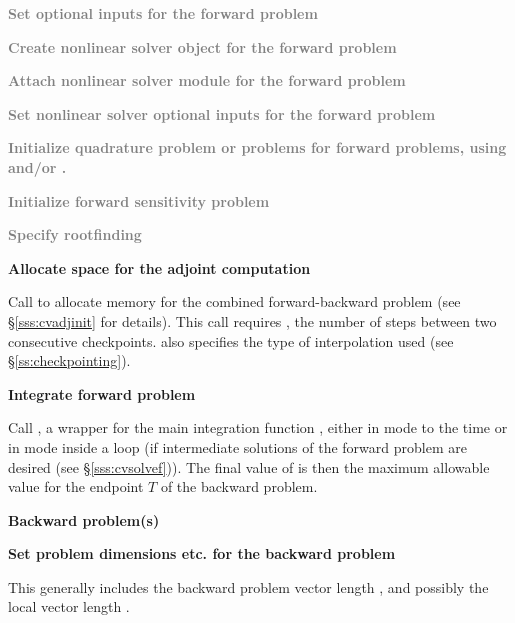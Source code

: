 \begin{Steps}
\item
  \textcolor{gray}{\bf Set optional inputs for the forward problem}

\item
  \textcolor{gray}{\bf Create nonlinear solver object for the forward problem}

\item
  \textcolor{gray}{\bf Attach nonlinear solver module for the forward problem}

\item
  \textcolor{gray}{\bf Set nonlinear solver optional inputs for the forward problem}

\item
  \textcolor{gray}{\bf Initialize quadrature problem or problems for forward
    problems, using  and/or .}

\item
  \textcolor{gray}{\bf Initialize forward sensitivity problem}

\item
  \textcolor{gray}{\bf Specify rootfinding}

\item
  {\bf Allocate space for the adjoint computation}

  Call \id{()} to allocate memory for the
  combined forward-backward problem (see \S\ref{sss:cvadjinit} for details).
  This call requires , the number of steps between two consecutive checkpoints.
   also specifies the type of interpolation used
  (see \S\ref{ss:checkpointing}).

\item
  {\bf Integrate forward problem}

  Call , a wrapper for the {\cvodes} main integration
  function , either in  mode to the time
   or in  mode inside a loop (if intermediate
  solutions of the forward problem are desired (see \S\ref{sss:cvsolvef})).
  The final value of  is then the maximum allowable value for the
  endpoint $T$ of the backward problem.

  \vspace{0.2in}\centerline{\bf Backward problem(s)}

 \item \label{i:back_start}
   {\bf Set problem dimensions etc. for the backward problem}

   This generally includes the backward problem vector length ,
   and possibly the local vector length .


\end{Steps}

